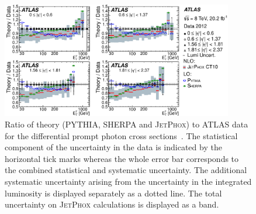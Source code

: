 \documentclass{PoS}
\providecommand{\JETPHOX} {{\textsc{JetPhox}}\xspace}
\begin{document}
\begin{figure}
\begin{center}
\includegraphics[width=0.9\textwidth]{Figure12.pdf} 
\caption{Ratio of theory (PYTHIA, SHERPA and \JETPHOX) to ATLAS data for the
  differential prompt photon cross sections~\cite{Aad:2016xcr}. The
  statistical component of the uncertainty in the data is indicated by the horizontal 
  tick marks whereas the whole error bar corresponds to the combined statistical and systematic uncertainty. The
  additional systematic uncertainty arising from the uncertainty in the integrated luminosity is displayed separately as
  a dotted line. The total uncertainty on \JETPHOX calculations is displayed as a band. }  
\label{fig:photon_MC}
\end{center}
\end{figure}
\end{document}
